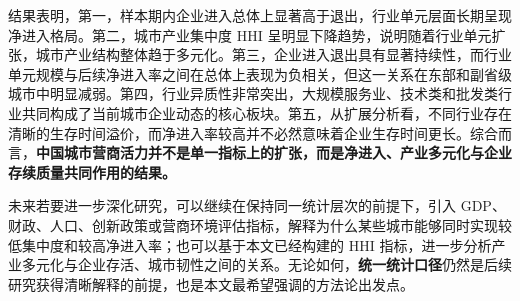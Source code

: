 \documentclass[12pt]{article}
\begin{document}
结果表明，第一，样本期内企业进入总体上显著高于退出，行业单元层面长期呈现净进入格局。第二，城市产业集中度 HHI 呈明显下降趋势，说明随着行业单元扩张，城市产业结构整体趋于多元化。第三，企业进入退出具有显著持续性，而行业单元规模与后续净进入率之间在总体上表现为负相关，但这一关系在东部和副省级城市中明显减弱。第四，行业异质性非常突出，大规模服务业、技术类和批发类行业共同构成了当前城市企业动态的核心板块。第五，从扩展分析看，不同行业存在清晰的生存时间溢价，而净进入率较高并不必然意味着企业生存时间更长。综合而言，\textbf{中国城市营商活力并不是单一指标上的扩张，而是净进入、产业多元化与企业存续质量共同作用的结果。}

未来若要进一步深化研究，可以继续在保持同一统计层次的前提下，引入 GDP、财政、人口、创新政策或营商环境评估指标，解释为什么某些城市能够同时实现较低集中度和较高净进入率；也可以基于本文已经构建的 HHI 指标，进一步分析产业多元化与企业存活、城市韧性之间的关系。无论如何，\textbf{统一统计口径}仍然是后续研究获得清晰解释的前提，也是本文最希望强调的方法论出发点。
\end{document}
